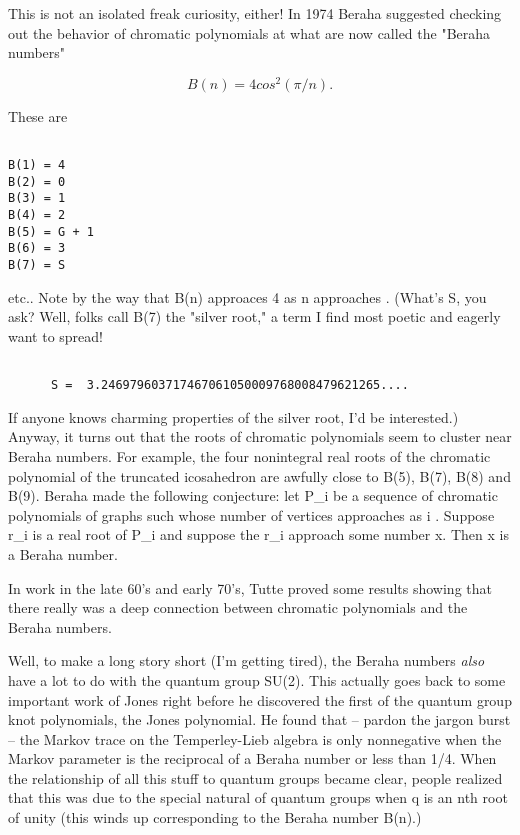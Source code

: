 This is not an isolated freak curiosity, either!  In 1974 Beraha
suggested checking out the behavior of chromatic polynomials at what are
now called the "Beraha numbers"


$$

                    B(n) = 4 cos^2(\pi /n).
$$
    

These are


\begin{verbatim}

B(1) = 4
B(2) = 0
B(3) = 1
B(4) = 2
B(5) = G + 1
B(6) = 3
B(7) = S
\end{verbatim}
    

etc..  Note by the way that B(n) approaces 4 as n approaches \infty .
(What's S, you ask?  Well, folks call B(7) the "silver root," a term I
find most poetic and eagerly want to spread!   


\begin{verbatim}

      S =  3.246979603717467061050009768008479621265....
\end{verbatim}
    

If anyone knows charming properties of the silver root, I'd be
interested.)  Anyway, it turns out that the roots of chromatic
polynomials seem to cluster near Beraha numbers.  For example, the four
nonintegral real roots of the chromatic polynomial of the truncated
icosahedron are awfully close to B(5), B(7), B(8) and B(9).  Beraha made
the following conjecture: let P_i be a sequence of chromatic polynomials
of graphs such whose number of vertices approaches \infty  as i \to 
\infty .  Suppose r_i is a real root of P_i and suppose the r_i
approach some number x.  Then x is a Beraha number.

In work in the late 60's and early 70's, Tutte proved some results
showing that there really was a deep connection between chromatic
polynomials and the Beraha numbers.  

Well, to make a long story short (I'm getting tired), the Beraha numbers
\emph{also} have a lot to do with the quantum group SU(2).  This actually
goes back to some important work of Jones right before he discovered the
first of the quantum group knot polynomials, the Jones polynomial.  He
found that -- pardon the jargon burst -- the Markov trace on the
Temperley-Lieb algebra is only nonnegative when the Markov parameter is
the reciprocal of a Beraha number or less than 1/4.  When the
relationship of all this stuff to quantum groups became clear, people
realized that this was due to the special natural of quantum groups when
q is an nth root of unity (this winds up corresponding to the Beraha
number B(n).)  


